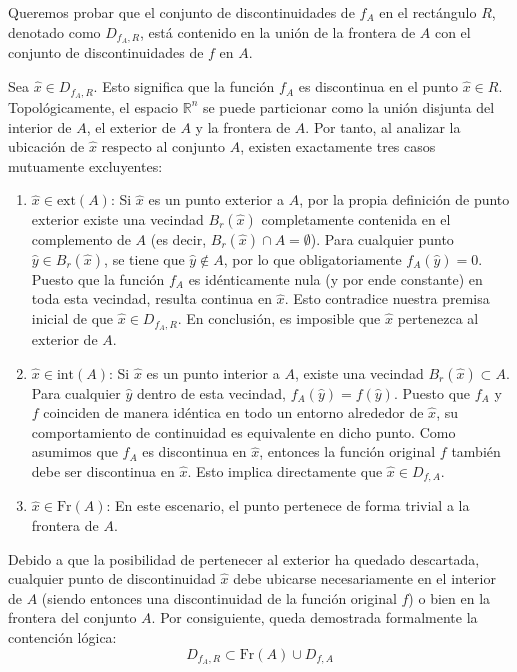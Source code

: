\documentclass[11pt,letterpaper]{article}
\begin{document}
Queremos probar que el conjunto de discontinuidades de $f_A$ en el rectángulo $R$, denotado como $D_{f_A, R}$, está contenido en la unión de la frontera de $A$ con el conjunto de discontinuidades de $f$ en $A$. 

Sea $\hat{x} \in D_{f_A, R}$. Esto significa que la función $f_A$ es discontinua en el punto $\hat{x} \in R$. 
Topológicamente, el espacio $\mathbb{R}^n$ se puede particionar como la unión disjunta del interior de $A$, el exterior de $A$ y la frontera de $A$. Por tanto, al analizar la ubicación de $\hat{x}$ respecto al conjunto $A$, existen exactamente tres casos mutuamente excluyentes:
\begin{enumerate}
    \item $\hat{x} \in \text{ext}(A)$: Si $\hat{x}$ es un punto exterior a $A$, por la propia definición de punto exterior existe una vecindad $B_r(\hat{x})$ completamente contenida en el complemento de $A$ (es decir, $B_r(\hat{x}) \cap A = \emptyset$). Para cualquier punto $\hat{y} \in B_r(\hat{x})$, se tiene que $\hat{y} \notin A$, por lo que obligatoriamente $f_A(\hat{y}) = 0$. Puesto que la función $f_A$ es idénticamente nula (y por ende constante) en toda esta vecindad, resulta continua en $\hat{x}$. Esto contradice nuestra premisa inicial de que $\hat{x} \in D_{f_A, R}$. En conclusión, es imposible que $\hat{x}$ pertenezca al exterior de $A$.
    \item $\hat{x} \in \text{int}(A)$: Si $\hat{x}$ es un punto interior a $A$, existe una vecindad $B_r(\hat{x}) \subset A$. Para cualquier $\hat{y}$ dentro de esta vecindad, $f_A(\hat{y}) = f(\hat{y})$. Puesto que $f_A$ y $f$ coinciden de manera idéntica en todo un entorno alrededor de $\hat{x}$, su comportamiento de continuidad es equivalente en dicho punto. Como asumimos que $f_A$ es discontinua en $\hat{x}$, entonces la función original $f$ también debe ser discontinua en $\hat{x}$. Esto implica directamente que $\hat{x} \in D_{f, A}$.
    \item $\hat{x} \in \text{Fr}(A)$: En este escenario, el punto pertenece de forma trivial a la frontera de $A$.
\end{enumerate}

Debido a que la posibilidad de pertenecer al exterior ha quedado descartada, cualquier punto de discontinuidad $\hat{x}$ debe ubicarse necesariamente en el interior de $A$ (siendo entonces una discontinuidad de la función original $f$) o bien en la frontera del conjunto $A$. Por consiguiente, queda demostrada formalmente la contención lógica:
\begin{equation*}
D_{f_A, R} \subset \text{Fr}(A) \cup D_{f, A}
\end{equation*}
\end{document}
